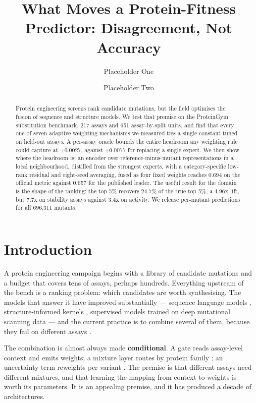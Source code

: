 \documentclass[sigconf,review,nonacm]{acmart}
\begin{document}
\title{What Moves a Protein-Fitness Predictor: Disagreement, Not Accuracy}
\author{Placeholder One}
\author{Placeholder Two}
\begin{abstract}
Protein engineering screens rank candidate mutations, but the field optimises the fusion of sequence and
structure models. We test that premise on the ProteinGym substitution benchmark, 217 assays and 651
assay-by-split units, and find that every one of seven adaptive weighting mechanisms we measured ties a
single constant tuned on held-out assays. A per-assay oracle bounds the entire headroom any weighting
rule could capture at +0.0027, against +0.0077 for replacing a single expert. We then show where the
headroom is: an encoder over reference-minus-mutant representations in a local neighbourhood, distilled
from the strongest experts, with a category-specific low-rank residual and eight-seed averaging, fused
as four fixed weights reaches 0.694 on the official metric against 0.657 for the published leader. The
useful result for the domain is the shape of the ranking: the top 5\% recovers 24.7\% of the true top
5\%, a 4.96x lift, but 7.7x on stability assays against 3.4x on activity. We release per-mutant
predictions for all 696,311 mutants.
\end{abstract}
\maketitle
\section{Introduction}\label{introduction}

A protein engineering campaign begins with a library of candidate mutations and a budget that covers
tens of assays, perhaps hundreds. Everything upstream of the bench is a ranking problem: which
candidates are worth synthesising. The models that answer it have improved substantially --- sequence
language models \cite{esm2}, structure-informed kernels \cite{kermut}, supervised models trained on deep
mutational scanning data \cite{proteinnpt} --- and the current practice is to combine several of them,
because they fail on different assays \cite{proteingym}.

The combination is almost always made \textbf{conditional}. A gate reads assay-level context and emits
weights; a mixture layer routes by protein family \cite{jacobs1991,shazeer2017}; an uncertainty
term reweights per variant \cite{deepsong}. The
premise is that different assays need different mixtures, and that learning the mapping from context to
weights is worth its parameters. It is an appealing premise, and it has produced a decade of
architectures.
\end{document}
